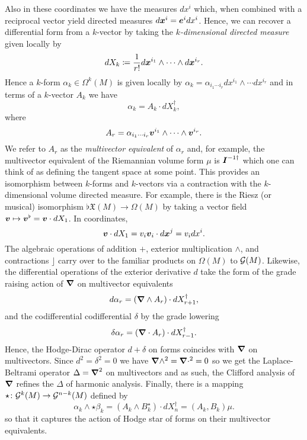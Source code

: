 \documentclass[conf]{new-aiaa}
\begin{document}
Also in these coordinates we have the measures $dx^i$ which, when combined with a reciprocal vector yield directed measures $d\boldsymbol{x}^i = \boldsymbol{e}^i dx^i$. Hence, we can recover a differential form from a $k$-vector by taking the \emph{$k$-dimensional directed measure} given locally by 
\begin{equation}
    dX_k \coloneqq \frac{1}{r!} d\boldsymbol{x}^{i_1}\wedge \cdots \wedge d\boldsymbol{x}^{i_r}.
\end{equation}
Hence a $k$-form $\alpha_k \in \Omega^k(M)$ is given locally by  $\alpha_k = \alpha_{i_1 \cdots i_r} dx^{i_1}\wedge \cdots dx^{i_r}$ and in terms of a $k$-vector $A_k$ we have
\begin{equation}
\alpha_k = A_k \cdot dX_k^\dagger,
\end{equation}
where
\begin{equation}
A_r = \alpha_{i_1 \cdots i_r} \boldsymbol{v}^{i_1} \wedge \cdots \wedge \boldsymbol{v}^{i_r}.
\end{equation}
We refer to $A_r$ as the \emph{multivector equivalent} of $\alpha_r$ and, for example, the multivector equivalent of the Riemannian volume form $\mu$ is $\boldsymbol{I}^{-1 \dagger}$ which one can think of as defining the tangent space at some point. This provides an isomorphism between $k$-forms and $k$-vectors via a contraction with the $k$-dimensional volume directed measure. For example, there is the Riesz (or musical) isomorphism $\flat \mathfrak{X}(M)\to \Omega(M)$ by taking a vector field $\boldsymbol{v} \mapsto \boldsymbol{v}^\flat = \boldsymbol{v} \cdot dX_1$. In coordinates,
\begin{equation}
\label{eq:line_element}
 \boldsymbol{v} \cdot dX_1 = v_i  \boldsymbol{v}_i \cdot d\boldsymbol{x}^j = v_i dx^i.
\end{equation}
The algebraic operations of addition $+$, exterior multiplication $\wedge$, and contractions $\rfloor$ carry over to the familiar products on $\Omega(M)$ to $\mathcal{G}(M)$. Likewise, the differential operations of the exterior derivative $d$ take the form of the grade raising action of $\boldsymbol{\nabla}$ on multivector equivalents
\begin{equation}
d \alpha_r = (\boldsymbol{\nabla} \wedge A_r) \cdot dX_{r+1}^\dagger,
\end{equation}
and the codifferential  codifferential $\delta$ by the grade lowering
\begin{equation}
\delta \alpha_r = (\boldsymbol{\nabla} \cdot A_r)\cdot dX_{r-1}^\dagger.
\end{equation} 
Hence, the Hodge-Dirac operator $d+\delta$ on forms coincides with $\boldsymbol{\nabla}$ on multivectors. Since $d^2=\delta^2=0$ we have $\boldsymbol{\nabla} \wedge^2 = \boldsymbol{\nabla} \cdot^2=0$ so we get the Laplace-Beltrami operator $\Delta = \boldsymbol{\nabla}^2$ on multivectors and as such, the Clifford analysis of $\boldsymbol{\nabla}$ refines the $\Delta$ of harmonic analysis. Finally, there is a mapping $\star \colon \mathcal{G}^k(M)\to \mathcal{G}^{n-k}(M)$ defined by
\begin{equation}
\alpha_k \wedge \star \beta_k = (A_k \wedge B_k^{\star})\cdot dX_n^\dagger = (A_k,B_k) \mu.
\end{equation}
so that it captures the action of Hodge star of forms on their multivector equivalents. 
\end{document}
